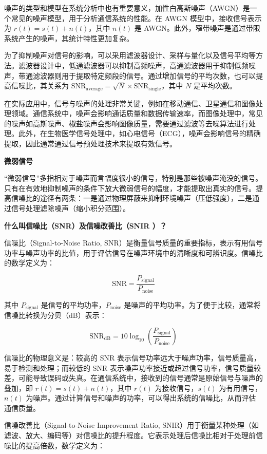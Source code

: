 \begin{enumerate}
	噪声的类型和模型在系统分析中也有重要意义，加性白高斯噪声（AWGN）是一个常见的噪声模型，用于分析通信系统的性能。在 AWGN 模型中，接收信号表示为 \( r(t) = s(t) + n(t) \)，其中 \( n(t) \) 是 AWGN。此外，窄带噪声是通过带限系统产生的噪声，其统计特性更加复杂。
	
	为了抑制噪声对信号的影响，可以采用滤波器设计、采样与量化以及信号平均等方法。滤波器设计中，低通滤波器可以抑制高频噪声，高通滤波器用于抑制低频噪声，带通滤波器则用于提取特定频段的信号。通过增加信号的平均次数，也可以提高信噪比，其关系为 \( \mathrm{SNR}_{\mathrm{average}} = \sqrt{N} \times \mathrm{SNR}_{\mathrm{single}} \)，其中 \( N \) 是平均次数。
	
	在实际应用中，信号与噪声的处理非常关键，例如在移动通信、卫星通信和图像处理领域。通信系统中，噪声会影响通话质量和数据传输速率，而图像处理中，常见的噪声如高斯噪声、椒盐噪声会影响图像质量，需要通过滤波等去噪算法进行处理。此外，在生物医学信号处理中，如心电信号（ECG），噪声会影响信号的精确提取，因此通常通过信号预处理技术来提取有效信号。
	
	\textbf{微弱信号}
	
	“微弱信号”多指相对于噪声而言幅度很小的信号，特别是那些被噪声淹没的信号。只有在有效地抑制噪声的条件下放大微弱信号的幅度，才能提取出真实的信号。提高信噪比的途径有两条：一是通过物理屏蔽来抑制环境噪声（压低强度），二是通过信号处理滤除噪声（缩小积分范围）。
	
	\textbf{什么叫信噪比（SNR）及信噪改善比（SNIR ）？  }
	
	信噪比（Signal-to-Noise Ratio, SNR）是衡量信号质量的重要指标，表示有用信号功率与噪声功率的比值，用于评估信号在噪声环境中的清晰度和可辨识度。信噪比的数学定义为：
	
	\[
	\mathrm{SNR} = \frac{P_{\text{signal}}}{P_{\text{noise}}}
	\]
	
	其中 \( P_{\text{signal}} \) 是信号的平均功率，\( P_{\text{noise}} \) 是噪声的平均功率。为了便于比较，通常将信噪比转换为分贝（dB）表示：
	
	\[
	\mathrm{SNR}_{\mathrm{dB}} = 10 \log_{10} \left( \frac{P_{\text{signal}}}{P_{\text{noise}}} \right)
	\]
	
	信噪比的物理意义是：较高的 SNR 表示信号功率远大于噪声功率，信号质量高，易于检测和处理；而较低的 SNR 表示噪声功率接近或超过信号功率，信号质量较差，可能导致误码或失真。在通信系统中，接收到的信号通常是原始信号与噪声的叠加，即 \( r(t) = s(t) + n(t) \)，其中 \( r(t) \) 为接收信号，\( s(t) \) 为有用信号，\( n(t) \) 为噪声。通过计算信号和噪声的功率，可以得出系统的信噪比，从而评估通信质量。
	
	信噪改善比（Signal-to-Noise Improvement Ratio, SNIR）用于衡量某种处理（如滤波、放大、编码等）对信噪比的提升程度。它表示处理后信噪比相对于处理前信噪比的提高倍数，数学定义为：
	

\end{enumerate}
